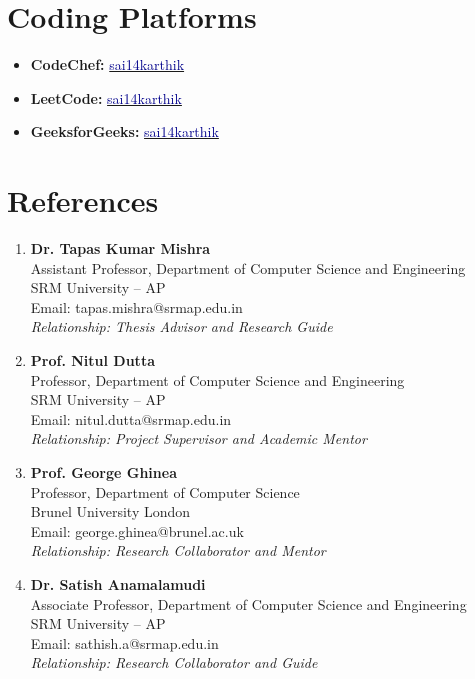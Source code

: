 \documentclass[a4paper,11pt]{article}
\begin{document}
\section{\textbf{Coding Platforms}}
\vspace{-0.2mm}
\small{
\begin{itemize}[leftmargin=*,labelsep=2mm]
  \item \textbf{CodeChef:} \href{https://www.codechef.com/users/sai14karthik}{\textcolor{darkblue}{sai14karthik}}
  \item \textbf{LeetCode:} \href{https://leetcode.com/sai14karthik}{\textcolor{darkblue}{sai14karthik}}
  \item \textbf{GeeksforGeeks:} \href{https://auth.geeksforgeeks.org/user/sai14karthik}{\textcolor{darkblue}{sai14karthik}}
\end{itemize}
}


\section{\textbf{References}}
\vspace{-0.2mm}
\small{
\begin{enumerate}[leftmargin=*,labelsep=2mm]
\item \textbf{Dr. Tapas Kumar Mishra}\\
   Assistant Professor, Department of Computer Science and Engineering\\
   SRM University – AP\\
   Email: tapas.mishra@srmap.edu.in\\
   \textit{Relationship: Thesis Advisor and Research Guide}

\item \textbf{Prof. Nitul Dutta}\\
   Professor, Department of Computer Science and Engineering\\
   SRM University – AP\\
   Email: nitul.dutta@srmap.edu.in\\
   \textit{Relationship: Project Supervisor and Academic Mentor}

\item \textbf{Prof. George Ghinea}\\
   Professor, Department of Computer Science\\
   Brunel University London\\
   Email: george.ghinea@brunel.ac.uk\\
   \textit{Relationship: Research Collaborator and Mentor}

\item \textbf{Dr. Satish Anamalamudi}\\
   Associate Professor, Department of Computer Science and Engineering\\
   SRM University – AP\\
   Email: sathish.a@srmap.edu.in\\
   \textit{Relationship: Research Collaborator and Guide}
\end{enumerate}
}
\end{document}
